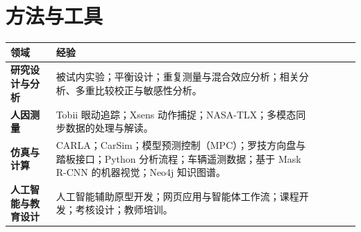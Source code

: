 \documentclass[10pt]{article}
\newcommand{\hd}[1]{\color{white}\bfseries #1}
\newcommand{\rowsep}{\\[3pt] \hline}
\begin{document}
\section*{方法与工具}
{\fontsize{9.5}{11.5}\selectfont
\begin{longtable}{|P{41mm}|P{132.6mm}|}
\hline{} \hd{领域} & \hd{经验} \rowsep
{} \textbf{研究设计与分析} & 被试内实验；平衡设计；重复测量与混合效应分析；相关分析、多重比较校正与敏感性分析。 \rowsep
{} \textbf{人因测量} & Tobii 眼动追踪；Xsens 动作捕捉；NASA-TLX；多模态同步数据的处理与解读。 \rowsep
{} \textbf{仿真与计算} & CARLA；CarSim；模型预测控制（MPC）；罗技方向盘与踏板接口；Python 分析流程；车辆遥测数据；基于 Mask R-CNN 的机器视觉；Neo4j 知识图谱。 \rowsep
{} \textbf{人工智能与教育设计} & 人工智能辅助原型开发；网页应用与智能体工作流；课程开发；考核设计；教师培训。 \rowsep
\end{longtable}}
\end{document}
